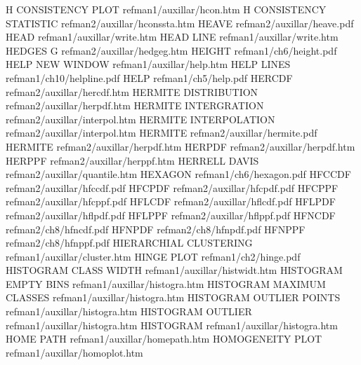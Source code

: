 H CONSISTENCY PLOT                      refman1/auxillar/hcon.htm
H CONSISTENCY STATISTIC                 refman2/auxillar/hconssta.htm
HEAVE                                   refman2/auxillar/heave.pdf
HEAD                                    refman1/auxillar/write.htm
HEAD LINE                               refman1/auxillar/write.htm
HEDGES G                                refman2/auxillar/hedgeg.htm
HEIGHT                                  refman1/ch6/height.pdf
HELP NEW WINDOW                         refman1/auxillar/help.htm
HELP LINES                              refman1/ch10/helpline.pdf
HELP                                    refman1/ch5/help.pdf
HERCDF                                  refman2/auxillar/hercdf.htm
HERMITE DISTRIBUTION                    refman2/auxillar/herpdf.htm
HERMITE INTERGRATION                    refman2/auxillar/interpol.htm
HERMITE INTERPOLATION                   refman2/auxillar/interpol.htm
HERMITE                                 refman2/auxillar/hermite.pdf
HERMITE                                 refman2/auxillar/herpdf.htm
HERPDF                                  refman2/auxillar/herpdf.htm
HERPPF                                  refman2/auxillar/herppf.htm
HERRELL DAVIS                           refman2/auxillar/quantile.htm
HEXAGON                                 refman1/ch6/hexagon.pdf
HFCCDF                                  refman2/auxillar/hfccdf.pdf
HFCPDF                                  refman2/auxillar/hfcpdf.pdf
HFCPPF                                  refman2/auxillar/hfcppf.pdf
HFLCDF                                  refman2/auxillar/hflcdf.pdf
HFLPDF                                  refman2/auxillar/hflpdf.pdf
HFLPPF                                  refman2/auxillar/hflppf.pdf
HFNCDF                                  refman2/ch8/hfncdf.pdf
HFNPDF                                  refman2/ch8/hfnpdf.pdf
HFNPPF                                  refman2/ch8/hfnppf.pdf
HIERARCHIAL CLUSTERING                  refman1/auxillar/cluster.htm
HINGE PLOT                              refman1/ch2/hinge.pdf
HISTOGRAM CLASS WIDTH                   refman1/auxillar/histwidt.htm
HISTOGRAM EMPTY BINS                    refman1/auxillar/histogra.htm
HISTOGRAM MAXIMUM CLASSES               refman1/auxillar/histogra.htm
HISTOGRAM OUTLIER POINTS                refman1/auxillar/histogra.htm
HISTOGRAM OUTLIER                       refman1/auxillar/histogra.htm
HISTOGRAM                               refman1/auxillar/histogra.htm
HOME PATH                               refman1/auxillar/homepath.htm
HOMOGENEITY PLOT                        refman1/auxillar/homoplot.htm
